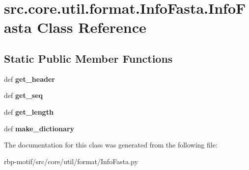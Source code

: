 \hypertarget{classsrc_1_1core_1_1util_1_1format_1_1InfoFasta_1_1InfoFasta}{\section{src.\-core.\-util.\-format.\-Info\-Fasta.\-Info\-Fasta Class Reference}
\label{classsrc_1_1core_1_1util_1_1format_1_1InfoFasta_1_1InfoFasta}
}
\subsection*{Static Public Member Functions}
\begin{DoxyCompactItemize}
\item 
\hypertarget{classsrc_1_1core_1_1util_1_1format_1_1InfoFasta_1_1InfoFasta_a8fa1175c763a5a321dd73e2908fd71f1}{def {\bfseries get\-\_\-header}}\label{classsrc_1_1core_1_1util_1_1format_1_1InfoFasta_1_1InfoFasta_a8fa1175c763a5a321dd73e2908fd71f1}

\item 
\hypertarget{classsrc_1_1core_1_1util_1_1format_1_1InfoFasta_1_1InfoFasta_a87b84fb11b0a5ab4f6ca46da6de2c7e7}{def {\bfseries get\-\_\-seq}}\label{classsrc_1_1core_1_1util_1_1format_1_1InfoFasta_1_1InfoFasta_a87b84fb11b0a5ab4f6ca46da6de2c7e7}

\item 
\hypertarget{classsrc_1_1core_1_1util_1_1format_1_1InfoFasta_1_1InfoFasta_a905fc69686c91a48b7f368379698614f}{def {\bfseries get\-\_\-length}}\label{classsrc_1_1core_1_1util_1_1format_1_1InfoFasta_1_1InfoFasta_a905fc69686c91a48b7f368379698614f}

\item 
\hypertarget{classsrc_1_1core_1_1util_1_1format_1_1InfoFasta_1_1InfoFasta_a15d33594e95c385efaffcdc0ec3f694d}{def {\bfseries make\-\_\-dictionary}}\label{classsrc_1_1core_1_1util_1_1format_1_1InfoFasta_1_1InfoFasta_a15d33594e95c385efaffcdc0ec3f694d}

\end{DoxyCompactItemize}


The documentation for this class was generated from the following file\-:\begin{DoxyCompactItemize}
\item 
rbp-\/motif/src/core/util/format/Info\-Fasta.\-py\end{DoxyCompactItemize}
